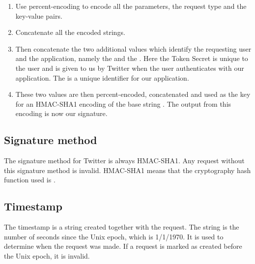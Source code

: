 \begin{enumerate}
  \item  Use percent-encoding to encode all the parameters, the
  request type and the key-value pairs.
  \item Concatenate all the encoded strings.
  \item Then concatenate the two additional values which identify the
  requesting user and the application, namely the 
  and the . Here the Token Secret is unique to the user
  and is given to us by Twitter when the user authenticates with our
  application. The  is a unique identifier for our
  application.
  \item These two values are then percent-encoded, concatenated and used as the
  key for an HMAC-SHA1 encoding of the base string \citep{TwitterHMACSHA}. The
  output from this encoding is now our signature.
\end{enumerate}

 
\subsection*{Signature method}
The signature method for Twitter is always \ac{HMAC-SHA1}. Any request without
this signature method is invalid. \ac{HMAC-SHA1} means that the cryptography
hash function used is  \citep{TwitterHMACSHA}.

\subsection*{Timestamp}
The timestamp is a string created together with the request. The string is the
number of seconds since the Unix epoch, which is 1/1/1970. It is used to
determine when the request was made. If a request is marked as created before
the Unix epoch, it is invalid.


